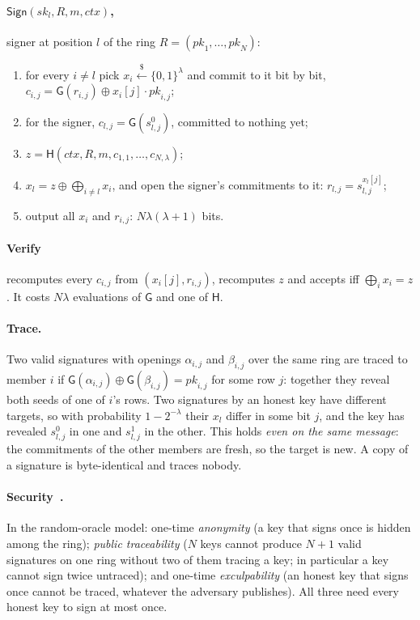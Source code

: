 \documentclass[11pt,a4paper]{article}
\newcommand{\bits}{\{0,1\}}
\newcommand{\pk}{\mathit{pk}}
\newcommand{\sk}{\mathit{sk}}
\newcommand{\Gf}{\mathsf{G}}
\newcommand{\Hf}{\mathsf{H}}
\newcommand{\ctx}{\mathit{ctx}}
\newcommand{\sample}{\xleftarrow{\$}}
\newcommand{\Sign}{\textsf{Sign}}
\newcommand{\Verify}{\textsf{Verify}}
\newcommand{\Trace}{\textsf{Trace}}
\theoremstyle{definition}
\begin{document}
\paragraph{$\Sign(\sk_l, R, m, \ctx)$,} signer at position $l$ of the
ring $R = (\pk_1, \ldots, \pk_N)$:
\begin{enumerate}[leftmargin=*]
\item for every $i \ne l$ pick $x_i \sample \bits^\lambda$ and commit to
      it bit by bit, $c_{i,j} = \Gf(r_{i,j}) \oplus x_i[j] \cdot \pk_{i,j}$;
\item for the signer, $c_{l,j} = \Gf(s^0_{l,j})$, committed to nothing yet;
\item $z = \Hf(\ctx, R, m, c_{1,1}, \ldots, c_{N,\lambda})$;
\item $x_l = z \oplus \bigoplus_{i \ne l} x_i$, and open the signer's
      commitments to it: $r_{l,j} = s^{x_l[j]}_{l,j}$;
\item output all $x_i$ and $r_{i,j}$: $N\lambda(\lambda + 1)$ bits.
\end{enumerate}

\paragraph{\Verify} recomputes every $c_{i,j}$ from $(x_i[j], r_{i,j})$,
recomputes $z$ and accepts iff $\bigoplus_i x_i = z$. It costs $N\lambda$
evaluations of $\Gf$ and one of $\Hf$.

\paragraph{\Trace.} Two valid signatures with openings $\alpha_{i,j}$ and
$\beta_{i,j}$ over the same ring are traced to member $i$ if
$\Gf(\alpha_{i,j}) \oplus \Gf(\beta_{i,j}) = \pk_{i,j}$ for some row $j$:
together they reveal both seeds of one of $i$'s rows. Two signatures by an
honest key have different targets, so with probability $1 - 2^{-\lambda}$
their $x_l$ differ in some bit $j$, and the key has revealed $s^0_{l,j}$
in one and $s^1_{l,j}$ in the other. This holds \emph{even on the same
message}: the commitments of the other members are fresh, so the target
is new. A copy of a signature is byte-identical and traces nobody.

\paragraph{Security~\cite{SZ21}.} In the random-oracle model: one-time
\emph{anonymity} (a key that signs once is hidden among the ring);
\emph{public traceability} ($N$ keys cannot produce $N + 1$ valid
signatures on one ring without two of them tracing a key; in particular
a key cannot sign twice untraced); and one-time \emph{exculpability} (an
honest key that signs once cannot be traced, whatever the adversary
publishes). All three need every honest key to sign at most once.
\end{document}
